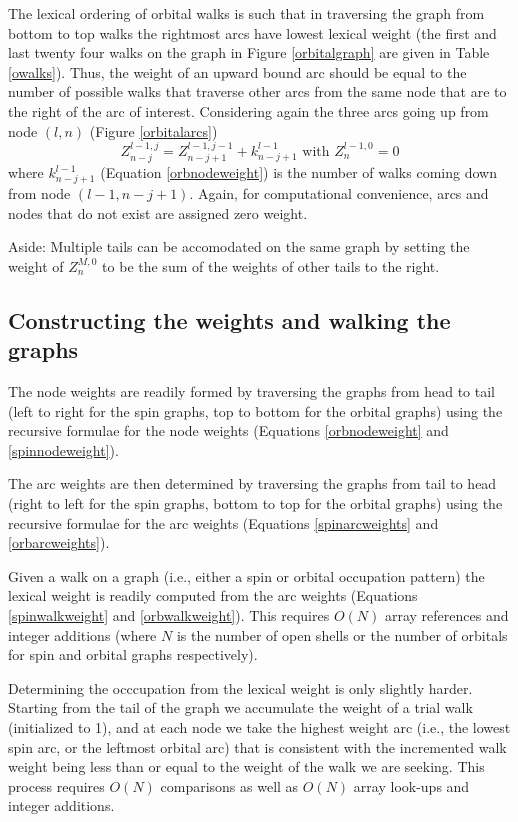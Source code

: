 \documentclass[fullpage,12pt,fleqn]{article}
\begin{document}
The lexical ordering of orbital walks is such that in traversing the
graph from bottom to top walks the rightmost arcs have lowest lexical
weight (the first and last twenty four walks on the graph in Figure
\ref{orbitalgraph} are given in Table \ref{owalks}).
Thus, the weight of an upward bound arc should be equal to the number
of possible walks that traverse other arcs from the same node that are
to the right of the arc of interest.  Considering again the three arcs
going up from node $(l,n)$ (Figure \ref{orbitalarcs}) 
\begin{equation}
  Z^{l-1,j}_{n-j} = Z^{l-1,j-1}_{n-j+1} + k^{l-1}_{n-j+1} \mbox{\ with\ }
  Z^{l-1,0}_n = 0 \label{orbarcweights}
\end{equation}
where $k^{l-1}_{n-j+1}$ (Equation \ref{orbnodeweight}) is the number of
walks coming down from node $(l-1,n-j+1)$.  Again, for computational
convenience, arcs and nodes that do not exist are assigned zero
weight. 

Aside: Multiple tails can be accomodated on the same graph by setting
the weight of $Z^{M,0}_n$ to be the sum of the weights of other tails
to the right.

\subsection{Constructing the weights and walking the graphs}

The node weights are readily formed by traversing the graphs from head
to tail (left to right for the spin graphs, top to bottom for the
orbital graphs) using the recursive formulae for the node weights
(Equations \ref{orbnodeweight} and \ref{spinnodeweight}). 

The arc weights are then determined by traversing the graphs from tail
to head (right to left for the spin graphs, bottom to top for the
orbital graphs) using the recursive formulae for the arc weights
(Equations \ref{spinarcweights} and \ref{orbarcweights}).

Given a walk on a graph (i.e., either a spin or orbital occupation
pattern) the lexical weight is readily computed from the arc weights
(Equations \ref{spinwalkweight} and \ref{orbwalkweight}). This
requires $O(N)$ array references and integer additions (where $N$ is
the number of open shells or the number of orbitals for spin and
orbital graphs respectively).

Determining the occcupation from the lexical weight is only slightly
harder.  Starting from the tail of the graph we accumulate the weight
of a trial walk (initialized to 1), and at each node we take the
highest weight arc (i.e., the lowest spin arc, or the leftmost orbital
arc) that is consistent with the incremented walk weight being less
than or equal to the weight of the walk we are seeking.  This process
requires $O(N)$ comparisons as well as $O(N)$ array look-ups and
integer additions.
\end{document}
